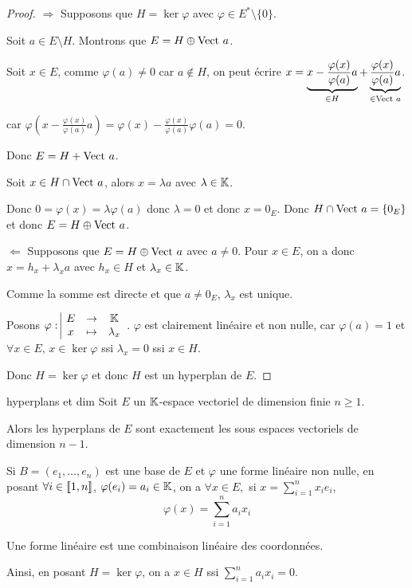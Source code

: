 \begin{proof}
    $\Rightarrow$ Supposons que $H = \ker \varphi$ avec $\varphi \in E^* \setminus \{0\}$.

    Soit $a \in E \setminus H$. Montrons que $E = H \oplus \operatorname{Vect} \, a$. 

    Soit $x \in E$, comme $\varphi(a) \neq 0$ car $a \notin H$, on peut écrire 
    $x = \underbrace{ x - \frac{\varphi(x)}{\varphi(a)} a}_{\in H} + \underbrace{\frac{\varphi(x)}{\varphi(a)} a}_{\in \operatorname{Vect} \, a}$.

    car $\varphi(x - \frac{\varphi(x) }{\varphi(a)} a) = \varphi(x) - \frac{\varphi(x)}{\varphi(a)} \varphi(a) = 0$.

    Donc $E = H + \operatorname{Vect} \, a$.

    Soit $x \in H \cap \operatorname{Vect} \, a$, alors $x = \lambda a$ avec $\lambda \in \mathbb{K}$.

    Donc $0 = \varphi(x) = \lambda \varphi(a)$ donc $\lambda = 0 $ et donc $x = 0_E$.
    Donc $H \cap \operatorname{Vect} \, a = \{0_E\}$ et donc $E = H \oplus \operatorname{Vect} \, a$.

    \lvspace $\Leftarrow$ Supposons que $E = H \oplus \operatorname{Vect} \, a$ avec $a \neq 0$. Pour $x \in E$, on a donc 
    $x = h_x + \lambda_x a$ avec $h_x \in H$ et $\lambda_x \in \mathbb{K}$.

    Comme la somme est directe et que $a \neq 0_E$, $\lambda_x$ est unique. 

    Posons $\varphi: \space \begin{array}{|ccc} \displaystyle E & \to & \displaystyle \mathbb{K} \\ \displaystyle x & \mapsto & \displaystyle \lambda_x \end{array}$. $\varphi$ est clairement linéaire et non nulle, 
    car $\varphi(a) = 1$ et $\forall x \in E, \, x \in \ker \varphi$ ssi $\lambda_x = 0$ ssi $x \in H$. 

    Donc $H = \ker \varphi$ et donc $H$ est un hyperplan de $E$.
\end{proof}

\begin{corollaire}{hyperplans et dim}{}
    Soit $E$ un $\mathbb{K}$-espace vectoriel de dimension finie $n \geqslant 1$. 

    Alors les hyperplans de $E$ sont exactement les sous espaces vectoriels de dimension $n - 1$.

    Si $B = (e_1, \dots, e_n)$ est une base de $E$ et $\varphi$ une forme linéaire non nulle, en posant 
    $\forall i \in [\![1, n]\!]$, $\varphi(e_i) = a_i \in \mathbb{K}$, on a 
    $\forall x \in E, $ si $x = \sum_{i=1}^n x_i e_i$,
    $$\varphi(x) = \sum_{i=1}^n a_i x_i$$

    Une forme linéaire est une combinaison linéaire des coordonnées. 

    Ainsi, en posant $H = \ker \varphi$, on a $x \in H$ ssi $\sum_{i=1}^n a_i x_i = 0$.
\end{corollaire}

